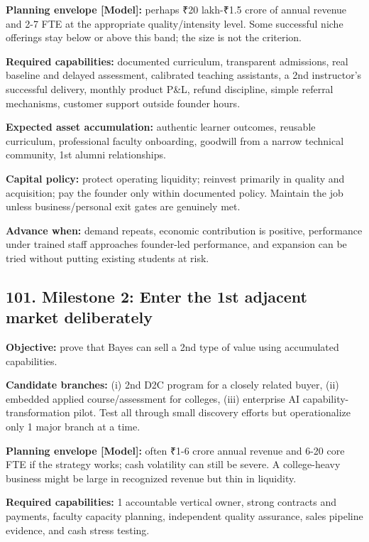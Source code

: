 \textbf{Planning envelope \textbf{[Model]}:} perhaps \textnormal{₹}20 lakh-\textnormal{₹}1.5 crore of annual revenue and 2-7 FTE at the appropriate quality/\allowbreak intensity level. Some successful niche offerings stay below or above this band; the size is not the criterion.

\textbf{Required capabilities:} documented curriculum, transparent admissions, real baseline and delayed assessment, calibrated teaching assistants, a 2nd instructor's successful delivery, monthly product P\&L, refund discipline, simple referral mechanisms, customer support outside founder hours.

\textbf{Expected asset accumulation:} authentic learner outcomes, reusable curriculum, professional faculty onboarding, goodwill from a narrow technical community, 1st alumni relationships.

\textbf{Capital policy:} protect operating liquidity; reinvest primarily in quality and acquisition; pay the founder only within documented policy. Maintain the job unless business/\allowbreak personal exit gates are genuinely met.

\textbf{Advance when:} demand repeats, economic contribution is positive, performance under trained staff approaches founder-led performance, and expansion can be tried without putting existing students at risk.

\subsection{101. Milestone 2: Enter the 1st adjacent market deliberately}

\textbf{Objective:} prove that Bayes can sell a 2nd type of value using accumulated capabilities.

\textbf{Candidate branches:} (i) 2nd D2C program for a closely related buyer, (ii) embedded applied course/\allowbreak assessment for colleges, (iii) enterprise AI capability-transformation pilot. Test all through small discovery efforts but operationalize only 1 major branch at a time.

\textbf{Planning envelope \textbf{[Model]}:} often \textnormal{₹}1-6 crore annual revenue and 6-20 core FTE if the strategy works; cash volatility can still be severe. A college-heavy business might be large in recognized revenue but thin in liquidity.

\textbf{Required capabilities:} 1 accountable vertical owner, strong contracts and payments, faculty capacity planning, independent quality assurance, sales pipeline evidence, and cash stress testing.

